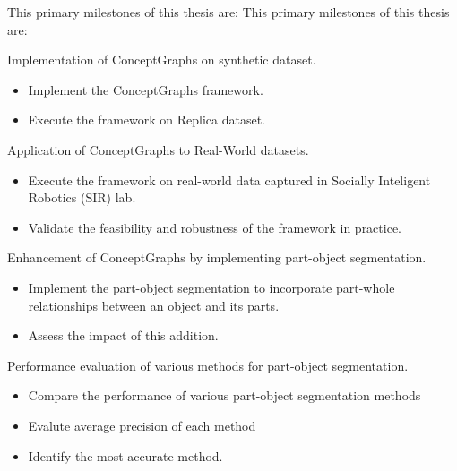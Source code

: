 This primary milestones of this thesis are:
This primary milestones of this thesis are:
\begin{compactenum}[1.]
\item	Implementation of ConceptGraphs on synthetic dataset.
\begin{itemize}
    \item Implement the ConceptGraphs framework.
    \item Execute the framework on Replica dataset.
\end{itemize}
\item	Application of ConceptGraphs to Real-World datasets.
\begin{itemize}
    \item Execute the framework on real-world data captured in Socially Inteligent Robotics (SIR) lab.
    \item Validate the feasibility and robustness of the framework in practice.
\end{itemize}
\item	Enhancement of ConceptGraphs by implementing part-object segmentation.
\begin{itemize}
    \item Implement the part-object segmentation to incorporate part-whole relationships between an object and its parts.
    \item Assess the impact of this addition.
\end{itemize}
\item	Performance evaluation of various methods for part-object segmentation.
\begin{itemize}
    \item Compare the performance of various part-object segmentation methods
    \item Evalute average precision of each method
    \item Identify the most accurate method.
\end{itemize}
\end{compactenum}
